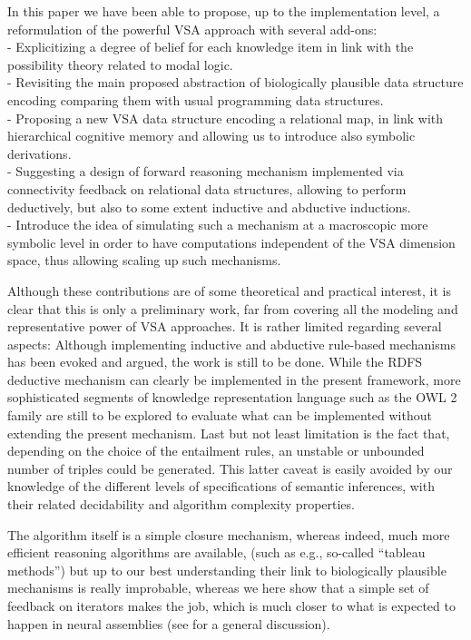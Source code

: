 \documentclass[sn-mathphys]{sn-jnl}
\begin{document}
In this paper we have been able to propose, up to the implementation level, a reformulation of the powerful VSA approach with several add-ons:
\\- Explicitizing a degree of belief for each knowledge item in link with the possibility theory related to modal logic.
\\- Revisiting the main proposed abstraction of biologically plausible data structure encoding comparing them with usual programming data structures.
\\- Proposing a new VSA data structure encoding a relational map, in link with hierarchical cognitive memory and allowing us to introduce also symbolic derivations.
\\- Suggesting a design of forward reasoning mechanism implemented via connectivity feedback on relational data structures, allowing to perform deductively, but also to some extent inductive and abductive inductions.
\\- Introduce the idea of simulating such a mechanism at a macroscopic more symbolic level in order to have computations independent of the VSA dimension space, thus allowing scaling up such mechanisms.

Although these contributions are of some theoretical and practical interest, it is clear that this is only a preliminary work, far from covering all the modeling and representative power of VSA approaches. It is rather limited regarding several aspects: Although implementing inductive and abductive rule-based mechanisms has been evoked and argued, the work is still to be done. While the RDFS deductive mechanism can clearly be implemented in the present framework, more sophisticated segments of knowledge representation language such as the OWL 2 family are still to be explored to evaluate what can be implemented without extending the present mechanism. Last but not least limitation is the fact that, depending on the choice of the entailment rules, an unstable or unbounded number of triples could be generated. This latter caveat is easily avoided by our knowledge of the different levels of specifications of semantic inferences, with their related decidability and algorithm complexity properties.

The algorithm itself is a simple closure mechanism, whereas indeed, much more efficient reasoning algorithms are available, (such as e.g., so-called ``tableau methods'') but up to our best understanding their link to biologically plausible mechanisms is really improbable, whereas we here show that a simple set of feedback on iterators makes the job, which is much closer to what is expected to happen in neural assemblies (see \cite{eliasmith_how_2013} for a general discussion).
\end{document}
